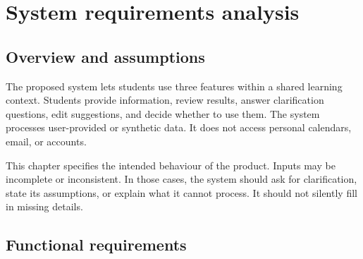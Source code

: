 \chapter{System requirements analysis}

\section{Overview and assumptions}

The proposed system lets students use three features within a shared learning context. Students provide information, review results, answer clarification questions, edit suggestions, and decide whether to use them. The system processes user-provided or synthetic data. It does not access personal calendars, email, or accounts.

This chapter specifies the intended behaviour of the product. Inputs may be incomplete or inconsistent. In those cases, the system should ask for clarification, state its assumptions, or explain what it cannot process. It should not silently fill in missing details.

\section{Functional requirements}

